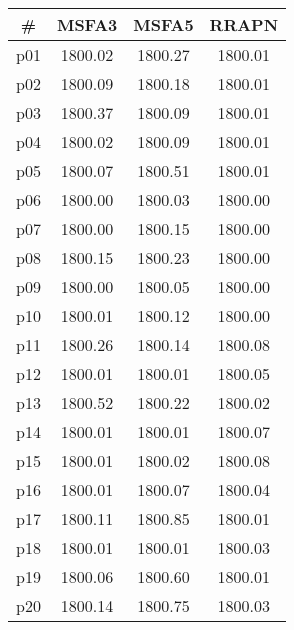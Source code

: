 \begin{tabular}{cccc}
\toprule
\textbf{\#} & \textbf{MSFA3} & \textbf{MSFA5} & \textbf{RRAPN}\\
\midrule
p01 & 1800.02 & 1800.27 & 1800.01\\
p02 & 1800.09 & 1800.18 & 1800.01\\
p03 & 1800.37 & 1800.09 & 1800.01\\
p04 & 1800.02 & 1800.09 & 1800.01\\
p05 & 1800.07 & 1800.51 & 1800.01\\
p06 & 1800.00 & 1800.03 & 1800.00\\
p07 & 1800.00 & 1800.15 & 1800.00\\
p08 & 1800.15 & 1800.23 & 1800.00\\
p09 & 1800.00 & 1800.05 & 1800.00\\
p10 & 1800.01 & 1800.12 & 1800.00\\
p11 & 1800.26 & 1800.14 & 1800.08\\
p12 & 1800.01 & 1800.01 & 1800.05\\
p13 & 1800.52 & 1800.22 & 1800.02\\
p14 & 1800.01 & 1800.01 & 1800.07\\
p15 & 1800.01 & 1800.02 & 1800.08\\
p16 & 1800.01 & 1800.07 & 1800.04\\
p17 & 1800.11 & 1800.85 & 1800.01\\
p18 & 1800.01 & 1800.01 & 1800.03\\
p19 & 1800.06 & 1800.60 & 1800.01\\
p20 & 1800.14 & 1800.75 & 1800.03\\
\bottomrule
\end{tabular}

